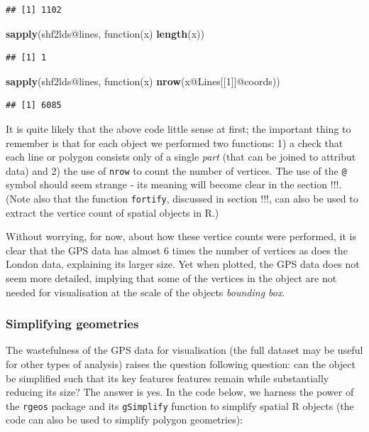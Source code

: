 \documentclass[]{article}
\newenvironment{Shaded}{}{}
\newcommand{\KeywordTok}[1]{\textcolor[rgb]{0.00,0.44,0.13}{\textbf{{#1}}}}
\newcommand{\DecValTok}[1]{\textcolor[rgb]{0.25,0.63,0.44}{{#1}}}
\newcommand{\NormalTok}[1]{{#1}}
\begin{document}
\begin{verbatim}
## [1] 1102
\end{verbatim}

\begin{Shaded}
\begin{Highlighting}[]

\KeywordTok{sapply}\NormalTok{(shf2lds@lines, function(x) }\KeywordTok{length}\NormalTok{(x))}
\end{Highlighting}
\end{Shaded}

\begin{verbatim}
## [1] 1
\end{verbatim}

\begin{Shaded}
\begin{Highlighting}[]
\KeywordTok{sapply}\NormalTok{(shf2lds@lines, function(x) }\KeywordTok{nrow}\NormalTok{(x@Lines[[}\DecValTok{1}\NormalTok{]]@coords))}
\end{Highlighting}
\end{Shaded}

\begin{verbatim}
## [1] 6085
\end{verbatim}

It is quite likely that the above code little sense at first; the
important thing to remember is that for each object we performed two
functions: 1) a check that each line or polygon consists only of a
single \emph{part} (that can be joined to attribut data) and 2) the use
of \texttt{nrow} to count the number of vertices. The use of the
\texttt{@} symbol should seem strange - its meaning will become clear in
the section !!!. (Note also that the function \texttt{fortify},
discussed in section !!!, can also be used to extract the vertice count
of spatial objects in R.)

Without worrying, for now, about how these vertice counts were
performed, it is clear that the GPS data has almost 6 times the number
of vertices as does the London data, explaining its larger size. Yet
when plotted, the GPS data does not seem more detailed, implying that
some of the vertices in the object are not needed for visualisation at
the scale of the objects \emph{bounding box}.

\subsubsection{Simplifying geometries}

The wastefulness of the GPS data for visualisation (the full dataset may
be useful for other types of analysis) raises the question following
question: can the object be simplified such that its key features
features remain while substantially reducing its size? The answer is
yes. In the code below, we harness the power of the \texttt{rgeos}
package and its \texttt{gSimplify} function to simplify spatial R
objects (the code can also be used to simplify polygon geometries):
\end{document}
